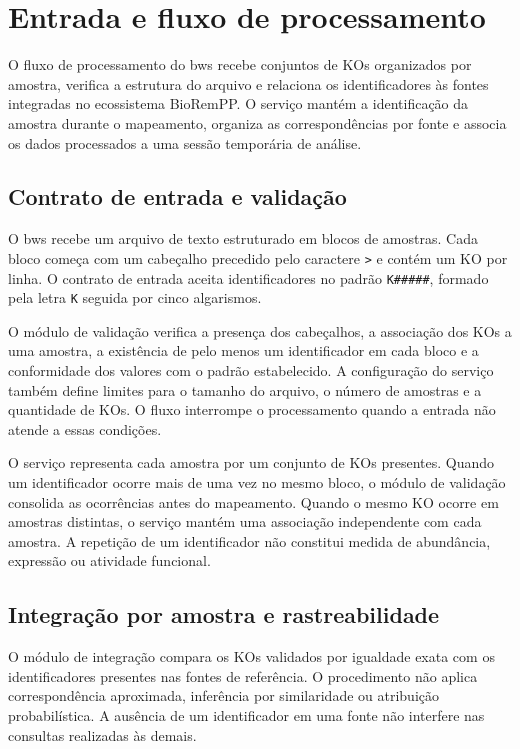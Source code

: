 \section{Entrada e fluxo de processamento}
\label{sec:c3-processamento}

O fluxo de processamento do \gls{bws} recebe conjuntos de KOs organizados por
amostra, verifica a estrutura do arquivo e relaciona os identificadores às
fontes integradas no ecossistema BioRemPP. O serviço mantém a identificação da
amostra durante o mapeamento, organiza as correspondências por fonte e associa
os dados processados a uma sessão temporária de análise.

\subsection{Contrato de entrada e validação}

O \gls{bws} recebe um arquivo de texto estruturado em blocos de amostras. Cada
bloco começa com um cabeçalho precedido pelo caractere \texttt{>} e contém um
KO por linha. O contrato de entrada aceita identificadores no padrão
\texttt{K\#\#\#\#\#}, formado pela letra \texttt{K} seguida por cinco
algarismos.

O módulo de validação verifica a presença dos cabeçalhos, a associação dos KOs
a uma amostra, a existência de pelo menos um identificador em cada bloco e a
conformidade dos valores com o padrão estabelecido. A configuração do serviço
também define limites para o tamanho do arquivo, o número de amostras e a
quantidade de KOs. O fluxo interrompe o processamento quando a entrada não
atende a essas condições.

O serviço representa cada amostra por um conjunto de KOs presentes. Quando um
identificador ocorre mais de uma vez no mesmo bloco, o módulo de validação
consolida as ocorrências antes do mapeamento. Quando o mesmo KO ocorre em
amostras distintas, o serviço mantém uma associação independente com cada
amostra. A repetição de um identificador não constitui medida de abundância,
expressão ou atividade funcional.

\subsection{Integração por amostra e rastreabilidade}

O módulo de integração compara os KOs validados por igualdade exata com os
identificadores presentes nas fontes de referência. O procedimento não aplica
correspondência aproximada, inferência por similaridade ou atribuição
probabilística. A ausência de um identificador em uma fonte não interfere nas
consultas realizadas às demais.

